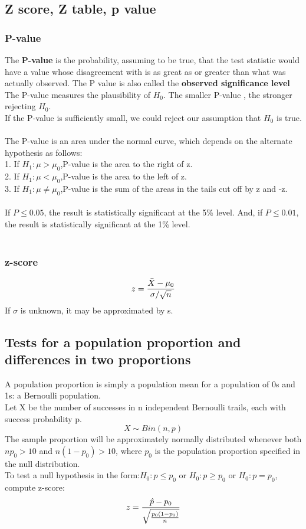 \documentclass[../main.tex]{subfiles}
\begin{document}
\subsection{Z score, Z table, p value}
\subsubsection*{P-value}
The \textbf{P-value} is the probability, assuming \hn to be true, that the test statistic would have a value whose disagreement with \hn is as great as or greater than what was actually observed. The P value is also called the \textbf{observed significance level}\\
The P-value measures the plausibility of $H_0$. The smaller P-value , the stronger rejecting $H_0$.\\
If the P-value is sufficiently small, we could reject our assumption that $H_0$ is true. \\
\\
The P-value is an area under the normal curve, which depends on the alternate hypothesis as follows:\\
1. If $H_1:\mu>\mu_0$,P-value is the area to the right of z.\\
2. If $H_1:\mu<\mu_0$,P-value is the area to the left of z.\\
3. If $H_1:\mu\neq\mu_0$,P-value is the sum of the areas in the tails cut off by z and -z.\\
\\
If $P\leq 0.05$, the result is statistically significant at the 5\% level. And, if $P\leq 0.01$, the result is statistically significant at the 1\% level.\\
\\
\subsubsection*{z-score}
\[z = \frac{\bar{X} - \mu _0 }{\sigma/{\sqrt{n}}}\]
If $\sigma$ is unknown, it may be approximated by s.

\subsection{Tests for a population proportion and differences in two proportions}
A population proportion is simply a population mean for a population of 0s and 1s: a Bernoulli population.\\
Let X be the number of successes in n independent Bernoulli trails, each with success probability p.
$$X\sim Bin(n,p)$$
The sample proportion will be approximately normally distributed whenever both $n p_0 >10$ and $n(1-p_0)>10$, where $p_0$ is the population proportion specified in the null distribution.\\
To test a null hypothesis in the form:$H_0:p\leq p_0$ or $H_0:p \geq p_0$ or $H_0: p=p_0$, compute z-score:
\[z = \frac{\hat{p} - p_0 }{\sqrt{\frac{p_0 (1-p_0)}{n}}}\]
\end{document}
